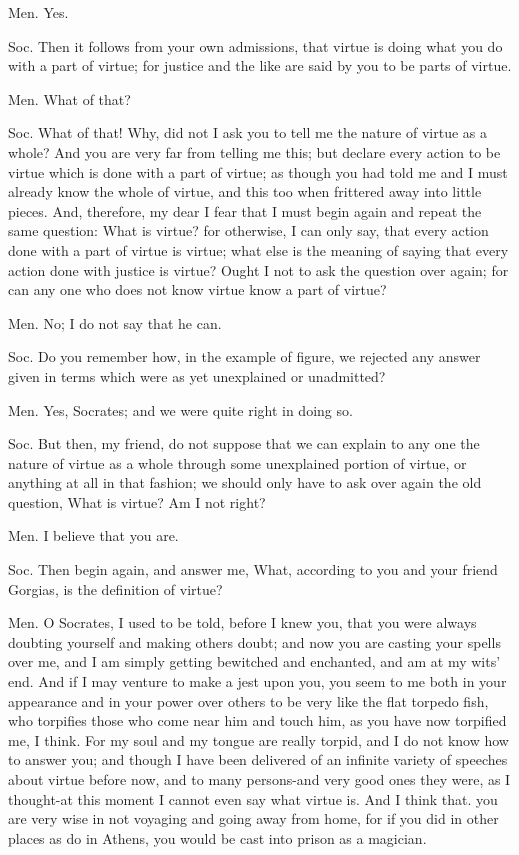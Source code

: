 Men. Yes. 

Soc. Then it follows from your own admissions, that virtue is doing
what you do with a part of virtue; for justice and the like are said
by you to be parts of virtue. 

Men. What of that? 

Soc. What of that! Why, did not I ask you to tell me the nature of
virtue as a whole? And you are very far from telling me this; but
declare every action to be virtue which is done with a part of virtue;
as though you had told me and I must already know the whole of virtue,
and this too when frittered away into little pieces. And, therefore,
my dear I fear that I must begin again and repeat the same question:
What is virtue? for otherwise, I can only say, that every action done
with a part of virtue is virtue; what else is the meaning of saying
that every action done with justice is virtue? Ought I not to ask
the question over again; for can any one who does not know virtue
know a part of virtue? 

Men. No; I do not say that he can. 

Soc. Do you remember how, in the example of figure, we rejected any
answer given in terms which were as yet unexplained or unadmitted?

Men. Yes, Socrates; and we were quite right in doing so.

Soc. But then, my friend, do not suppose that we can explain to any
one the nature of virtue as a whole through some unexplained portion
of virtue, or anything at all in that fashion; we should only have
to ask over again the old question, What is virtue? Am I not right?

Men. I believe that you are. 

Soc. Then begin again, and answer me, What, according to you and your
friend Gorgias, is the definition of virtue? 

Men. O Socrates, I used to be told, before I knew you, that you were
always doubting yourself and making others doubt; and now you are
casting your spells over me, and I am simply getting bewitched and
enchanted, and am at my wits' end. And if I may venture to make a
jest upon you, you seem to me both in your appearance and in your
power over others to be very like the flat torpedo fish, who torpifies
those who come near him and touch him, as you have now torpified me,
I think. For my soul and my tongue are really torpid, and I do not
know how to answer you; and though I have been delivered of an infinite
variety of speeches about virtue before now, and to many persons-and
very good ones they were, as I thought-at this moment I cannot even
say what virtue is. And I think that. you are very wise in not voyaging
and going away from home, for if you did in other places as do in
Athens, you would be cast into prison as a magician. 

